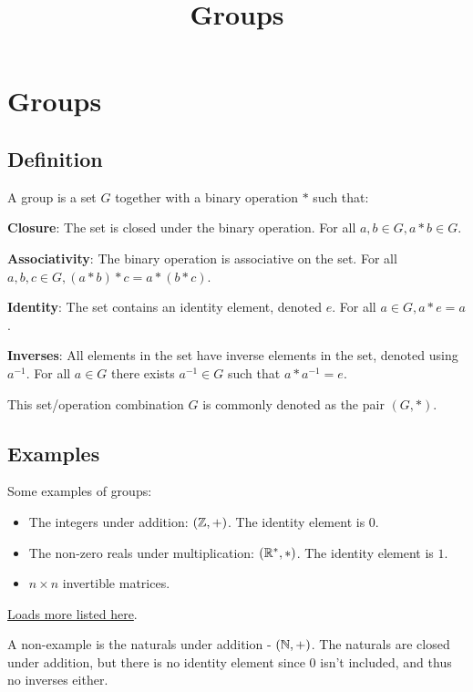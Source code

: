 \documentclass{article}
\title{Groups}
\begin{document}
\section{Groups}

\subsection{Definition}

\begin{definition}[group]
A group is a \@{set} $G$ together with a binary operation $*$ such that:

\textbf{Closure}: The set is closed under the binary operation. For all $a, b \in G, a * b \in G$.

\textbf{Associativity}: The binary operation is associative on the set. For all $a, b, c \in G, (a * b) * c = a * (b * c)$.

\textbf{Identity}: The set contains an identity element, denoted $e$. For all $a \in G, a * e = a$.

\textbf{Inverses}: All elements in the set have inverse elements in the set, denoted using $a^{-1}$. For all $a \in G$ there exists $a^{-1} \in G$ such that $a * a^{-1} = e$.

This set/operation combination $G$ is commonly denoted as the pair $(G, *)$.
\end{definition}

\subsection{Examples}

\begin{example}
Some examples of \@{groups}:

\begin{itemize}
\item The \@{integers} under addition: $(\mathbb{Z}, +)$. The identity element is $0$.
\end{itemize}

\begin{itemize}
\item The non-zero reals under multiplication: $(\mathbb{R}^{*}, *)$. The identity element is $1$.
\end{itemize}

\begin{itemize}
\item $n \times n$ invertible matrices.
\end{itemize}

\href{https://en.wikipedia.org/wiki/Examples_of_groups}{Loads more listed here}.

A non-example is the \@{naturals} under addition - $(\mathbb{N}, +)$. The naturals are closed under addition, but there is no identity element since $0$ isn't included, and thus no inverses either.
\end{example}
\end{document}
